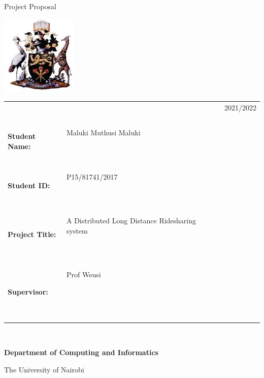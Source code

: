 \begin{center}
    Project Proposal
\end{center}

\begin{center}
    \includegraphics[scale=1]{uon}
\end{center}

{\vspace{7em}}

\begin{center}
    \begin{tabular}{|lp{5.0cm}lll|}
        \hline
                                &                       &  &   & {\small{2021/2022}} \\
                                &                       &  &   &                     \\
                                &                       &  &   &                     \\
        \textbf{Student Name:}  & Maluki Muthusi Maluki

        \                       &                       &  &                         \\
        \textbf{Student ID:}    & P15/81741/2017

        \                       &                       &  &                         \\
        \textbf{Project Title:} &
        A Distributed Long Distance Ridesharing system
        
        \                       &                       &  &                         \\
        \textbf{Supervisor:}    & Prof Weusi


        \

        \                       &                       &  &                         \\
        \hline
    \end{tabular}
\end{center}

\

{\vspace{7em}}

\begin{center}
    \Huge{{\textbf{Department of Computing and Informatics}}}
\end{center}

{\medskip}

\begin{center}
    The University of Nairobi
\end{center}